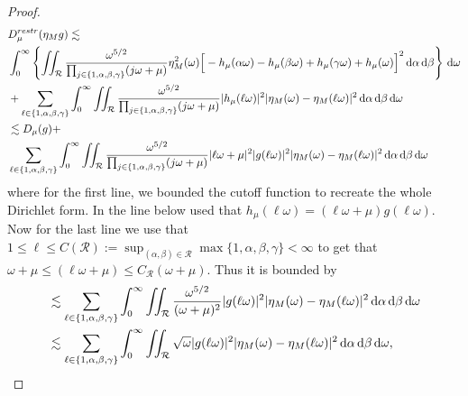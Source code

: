 \documentclass[reqno,11pt,letterpaper]{amsart}
\numberwithin{equation}{section}
\newcommand{\dd}{\, {\rm d}}
\begin{document}
\begin{proof}
\begin{equation}
\begin{split}
        &D_\mu^{restr}(\eta_M g) \lesssim \\
        &\int_0^\infty \left\{ \iint_{\mathcal{R}} \frac{\omega^{5/2}}{ \prod_{j\in \{1,\alpha, \beta, \gamma\}}(j \omega+\mu)} \eta_M^2 (\omega) \Big[ 
         -h_\mu(\alpha\omega) - h_\mu(\beta\omega) + h_\mu(\gamma\omega) +h_\mu(\omega) \Big]^2 \dd\alpha\dd\beta \right\} \dd\omega\\
         & + \sum_{\ell \in \{1,\alpha, \beta, \gamma\}} \int_0^\infty \iint_{\mathcal{R}} \frac{\omega^{5/2}}{ \prod_{j\in \{1,\alpha, \beta, \gamma\}}(j \omega+\mu)}|h_\mu (\ell\omega)|^2|\eta_M (\omega) - \eta_M(\ell\omega) |^2 \dd\alpha\dd\beta 
         \dd\omega \\
         & \lesssim D_\mu(g)  + \\
         & \sum_{\ell \in \{1,\alpha, \beta, \gamma\}} \int_0^\infty \iint_{\mathcal{R}} \frac{\omega^{5/2}}{ \prod_{j\in \{1,\alpha, \beta, \gamma\}}(j \omega+\mu)} | \ell\omega + \mu|^2 |g (\ell\omega)|^2
         |\eta_M (\omega) - \eta_M(\ell\omega) |^2 \dd\alpha\dd\beta 
         \dd\omega
        \end{split}
    \end{equation}
    where for the first line, we bounded the cutoff function to recreate the whole Dirichlet form. In the line below used  that $h_\mu(\ell\omega) = (\ell\omega + \mu)g(\ell\omega)$. 
    Now for the last line we use that $1\leq \ell \leq C(\mathcal{R}):=\sup_{(\alpha, \beta) \in \mathcal{R} } 
  \max\{1,\alpha,\beta,\gamma\}<\infty$ to get that $\omega+\mu \leq (\ell\omega+\mu)\leq C_{\mathcal{R}} (\omega+\mu)$. Thus it is bounded by 
    \begin{equation} \label{eq:transfer_coercivityProof3}
        \begin{split} & 
        \lesssim \sum_{\ell \in \{1,\alpha, \beta, \gamma\}} \int_0^\infty \iint_{\mathcal{R}}  \frac{\omega^{5/2}}{(\omega+\mu)^2} 
    |g (\ell\omega)|^2|\eta_M (\omega) - \eta_M(\ell\omega) |^2 \dd\alpha\dd\beta \dd\omega\\
    &\lesssim \sum_{\ell \in \{1,\alpha, \beta, \gamma\}} \int_0^\infty \iint_{\mathcal{R}} \sqrt{\omega}|g (\ell\omega)|^2|\eta_M (\omega) - \eta_M(\ell\omega) |^2 \dd\alpha\dd\beta \dd\omega,  \end{split}
    \end{equation}

\end{proof}
\end{document}
